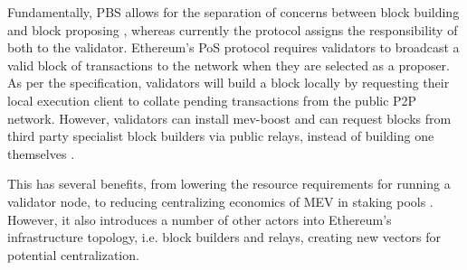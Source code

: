 \documentclass[conference]{IEEEtran}
\begin{document}
Fundamentally, PBS allows for the separation of concerns between block building and block proposing \cite{ethereum2023}, whereas currently the protocol assigns the responsibility of both to the validator.  Ethereum's PoS protocol requires validators to broadcast a valid block of transactions to the network when they are selected as a proposer.  As per the specification, validators will build a block locally by requesting their local execution client to collate pending transactions from the public P2P network. However, validators can install mev-boost and can request blocks from third party specialist block builders via public relays, instead of building one themselves \cite{ethereum2022}.

This has several benefits, from lowering the resource requirements for running a validator node, to reducing centralizing economics of MEV in staking pools \cite{buterin2021}.  However, it also introduces a number of other actors into Ethereum's infrastructure topology, i.e. block builders and relays, creating new vectors for potential centralization.
\end{document}
